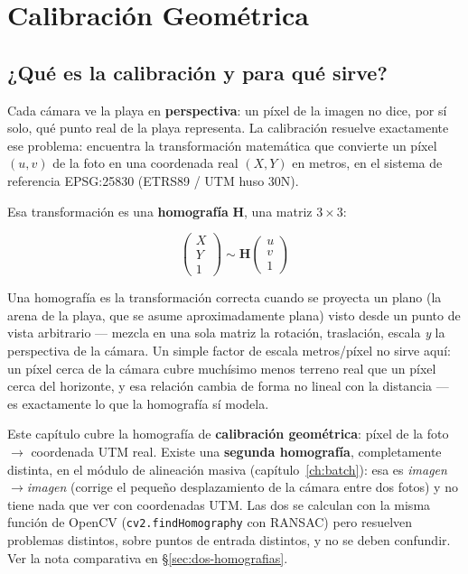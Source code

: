 \chapter{Calibración Geométrica}
\label{ch:calibration}

\section{¿Qué es la calibración y para qué sirve?}

Cada cámara ve la playa en \textbf{perspectiva}: un píxel de la imagen no dice, por sí solo,
qué punto real de la playa representa. La calibración resuelve exactamente ese problema: encuentra
la transformación matemática que convierte un píxel $(u,v)$ de la foto en una coordenada real
$(X,Y)$ en metros, en el sistema de referencia EPSG:25830 (ETRS89 / UTM huso 30N).

Esa transformación es una \textbf{homografía} $\mathbf{H}$, una matriz $3\times3$:

\begin{equation}
  \begin{pmatrix} X \\ Y \\ 1 \end{pmatrix}
  \sim
  \mathbf{H}
  \begin{pmatrix} u \\ v \\ 1 \end{pmatrix}
  \label{eq:homography}
\end{equation}

\begin{infobox}
Una homografía es la transformación correcta cuando se proyecta un plano (la arena de la
playa, que se asume aproximadamente plana) visto desde un punto de vista arbitrario —
mezcla en una sola matriz la rotación, traslación, escala \emph{y} la perspectiva de la
cámara. Un simple factor de escala metros/píxel no sirve aquí: un píxel cerca de la cámara
cubre muchísimo menos terreno real que un píxel cerca del horizonte, y esa relación cambia de
forma no lineal con la distancia — es exactamente lo que la homografía sí modela.
\end{infobox}

\begin{warnbox}
Este capítulo cubre la homografía de \textbf{calibración geométrica}: píxel de la foto
$\rightarrow$ coordenada UTM real. Existe una \textbf{segunda homografía}, completamente
distinta, en el módulo de alineación masiva (capítulo~\ref{ch:batch}): esa es
\emph{imagen$\rightarrow$imagen} (corrige el pequeño desplazamiento de la cámara entre dos
fotos) y no tiene nada que ver con coordenadas UTM. Las dos se calculan con la misma función
de OpenCV (\texttt{cv2.findHomography} con RANSAC) pero resuelven problemas distintos, sobre
puntos de entrada distintos, y no se deben confundir. Ver la nota comparativa en
\S\ref{sec:dos-homografias}.
\end{warnbox}


